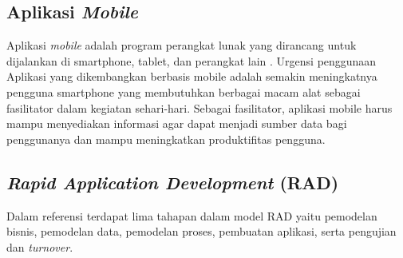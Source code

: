 \begin{flushleft}
\begin{justify}
        \subsection{Aplikasi \textit{Mobile}}
        Aplikasi \textit{mobile} adalah program perangkat lunak yang dirancang untuk dijalankan di smartphone, tablet, dan perangkat lain \cite{mobile}. Urgensi penggunaan Aplikasi yang dikembangkan berbasis mobile adalah semakin meningkatnya pengguna smartphone yang membutuhkan berbagai macam alat sebagai fasilitator dalam kegiatan sehari-hari. Sebagai fasilitator, aplikasi mobile harus mampu menyediakan informasi agar dapat menjadi sumber data bagi penggunanya dan mampu meningkatkan produktifitas pengguna. 
        \\
        \subsection{\textit{Rapid Application Development} (RAD)}
        Dalam referensi \cite{Sukamto} terdapat lima tahapan dalam model RAD yaitu pemodelan bisnis, pemodelan data, 
        pemodelan proses, pembuatan aplikasi, serta pengujian dan \textit{turnover}.
        
        \begin{figure}[ht]
            \centering
           

\end{figure}
\end{justify}
\end{flushleft}
